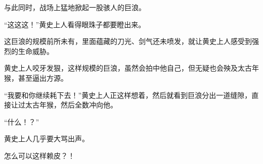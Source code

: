 \begin{this_body}
与此同时，战场上猛地掀起一股骇人的巨浪。

“这这这！”黄史上人看得眼珠子都要瞪出来。

这巨浪的规模前所未有，里面蕴藏的刀光、剑气还未喷发，就让黄史上人感受到强烈的生命威胁。

黄史上人咬牙发狠，这样规模的巨浪，虽然会拍中他自己，但无疑也会殃及太古年猴，甚至逼出方源。

“我要和你继续耗下去！”黄史上人正这样想着，然后就看到巨浪分出一道缝隙，直接让过太古年猴，然后全数冲向他。

“什么！？”

黄史上人几乎要大骂出声。

怎么可以这样赖皮？！

\end{this_body}

